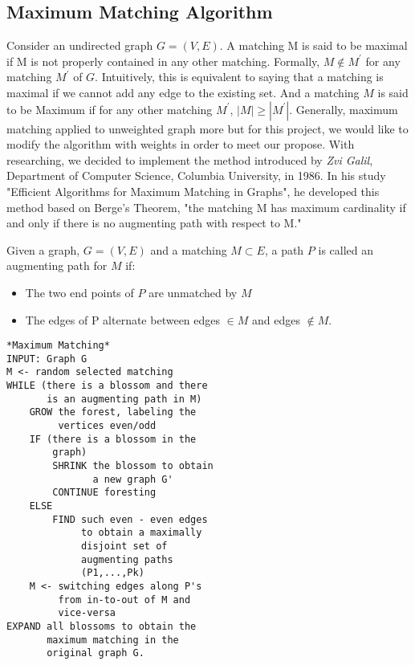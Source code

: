 \documentclass[twoside,twocolumn]{article}
\begin{document}
    \subsection{Maximum Matching Algorithm}
    Consider an undirected graph $G=(V,E)$. A matching M is said to be maximal if M is not properly contained in any other matching.
    Formally, $M\notin M^{'}$ for any matching $M^{'}$ of $G$. Intuitively, this is equivalent to saying that a matching is maximal 
    if we cannot add any edge to the existing set. And a matching $M$ is said to be Maximum if for any other matching $M^{'}$, 
    $|M|\geq |M^{'}|$. Generally, maximum matching applied to unweighted graph more but for this project,
    we would like to modify the algorithm with weights in order to meet our propose. With researching, we decided to implement the method
    introduced by \textit{Zvi Galil}, Department of Computer Science, Columbia University, in 1986. In his study "Efficient Algorithms
    for Maximum Matching in Graphs", he developed this method based on Berge's Theorem, "the matching M has maximum cardinality if and 
    only if there is no augmenting path with respect to M."

    \indent Given a graph, $G=(V,E)$ and a matching $M \subset E$, a path $P$ is called an augmenting path for $M$ if:
    \begin{itemize}
        \item The two end points of $P$ are unmatched by $M$
        \item The edges of P alternate between edges $\in M$ and edges $\notin M$.
    \end{itemize}
    
    \begin{lstlisting}
*Maximum Matching*
INPUT: Graph G
M <- random selected matching
WHILE (there is a blossom and there 
       is an augmenting path in M)
    GROW the forest, labeling the 
         vertices even/odd
    IF (there is a blossom in the 
        graph)
        SHRINK the blossom to obtain 
               a new graph G'
        CONTINUE foresting
    ELSE
        FIND such even - even edges 
             to obtain a maximally 
             disjoint set of 
             augmenting paths 
             (P1,...,Pk)
    M <- switching edges along P's 
         from in-to-out of M and 
         vice-versa
EXPAND all blossoms to obtain the 
       maximum matching in the 
       original graph G.

    \end{lstlisting}
\end{document}
